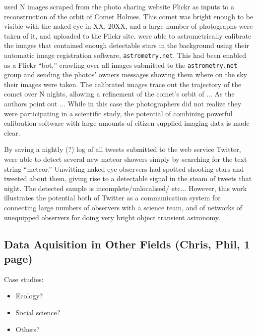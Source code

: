 \documentclass{ar2e}
\begin{document}
\citet{Lang++2011} used N images scraped from the photo sharing website Flickr
as inputs to a reconstruction of the orbit of Comet Holmes. This comet was
bright enough to be visible with the naked eye in XX, 20XX, and a large number
of photographs were taken of it, and uploaded to the Flickr site.
\citeauthor{Lang++2011} were able to astrometrically calibrate the images that
contained enough detectable stars in the background using their automatic
image registration software, \texttt{astrometry.net}. This had been enabled as
a Flickr ``bot,'' crawling over all images submitted to the
\texttt{astrometry.net} group and sending the photos' owners messages showing
them where on the sky their images were taken. The calibrated images trace out
the trajectory of the comet over N nights, allowing a refinement of the
comet's orbit of ... As the authors point out ...  While in this case the
photographers did not realize they were participating in a scientific study,
the potential of combining powerful calibration software with large amounts of
citizen-supplied imaging data is made clear. 


By saving a nightly (?) log of all tweets submitted to the web service
Twitter, \citet{Barentsen++2010} were able to 
detect several new meteor showers simply by searching for the text string
``meteor.'' Unwitting naked-eye observers had spotted shooting stars and
tweeted about them, giving rise to a detectable signal in the steam of tweets
that night. The detected sample is incomplete/unlocalised/ etc... However,
this work illustrates the potential both of Twitter as a communication system
for connecting large numbers of observers with a science team, and of networks
of unequipped observers for doing very bright object transient astronomy.



\subsection{Data Aquisition in Other Fields (\textbf{Chris}, Phil, 1 page)}
\label{sec:obs:non-astro}

Case studies:
\begin{itemize}
\item Ecology?
\item Social science?
\item Others?
\end{itemize}
\end{document}
